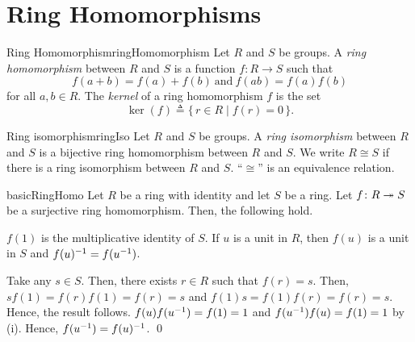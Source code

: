\documentclass[../modern_algebra.tex]{subfiles}
\begin{document}
\section{Ring Homomorphisms}

\begin{Definition}[colbacktitle=red!75!black]{Ring Homomorphism}{ringHomomorphism}
    Let \(R\) and \(S\) be groups.
    A \textit{ring homomorphism} between \(R\) and \(S\) is a function \(f \colon R \to S\)
    such that
    \[
        f(a + b) = f(a) + f(b) ~\text{and}~ f(ab) = f(a)f(b)
    \]
    for all \(a, b \in R\).
    The \textit{kernel} of a ring homomorphism \(f\)
    is the set
    \[
        \ker(f) \triangleq \{\,r \in R \mid f(r) = 0\,\}.
    \]
\end{Definition}

\begin{Definition}[colbacktitle=red!75!black]{Ring isomorphism}{ringIso}
    Let \(R\) and \(S\) be groups.
    A \textit{ring isomorphism} between \(R\) and \(S\)
    is a bijective ring homomorphism between \(R\) and \(S\).
    We write \(R \cong S\) if there is a ring isomorphism between \(R\) and \(S\).
    ``\(\cong\)'' is an equivalence relation.
\end{Definition}

\begin{Theorem}{}{basicRingHomo}
    Let \(R\) be a ring with identity and let \(S\) be a ring.
    Let \(f \colon R \twoheadrightarrow S\) be a surjective ring homomorphism.
    Then, the following hold.
    \begin{enumerate}[nolistsep, label=(\roman*), ref=\protect{\Cref{th:basicRingHomo} (\roman*)}]
        \ii\label{itm:basicRingHomo.i}
        \(f(1)\) is the multiplicative identity of \(S\).
        \ii\label{itm:basicRingHomo.ii}
        If \(u\) is a unit in \(R\), then \(f(u)\) is a unit in \(S\) and \(f(u)^{-1} = f(u^{-1})\).
    \end{enumerate}
\end{Theorem}
\begin{myclaim}[Proof]\hfill
\begin{enumerate}[nolistsep, label=(\roman*), listparindent=\parindent]
    \ii
    Take any \(s \in S\). Then, there exists \(r \in R\) such that \(f(r) = s\).
    Then, \(sf(1) = f(r)f(1) = f(r) = s\) and \(f(1)s = f(1)f(r) = f(r) = s\).
    Hence, the result follows.
    \ii
    \(f(u) f(u^{-1}) = f(1) = 1\) and \(f(u^{-1})f(u) = f(1) = 1\) by (i).
    Hence, \(f(u^{-1}) = f(u)^{-1}\).
    \qed
\end{enumerate}
\end{myclaim}
\end{document}
